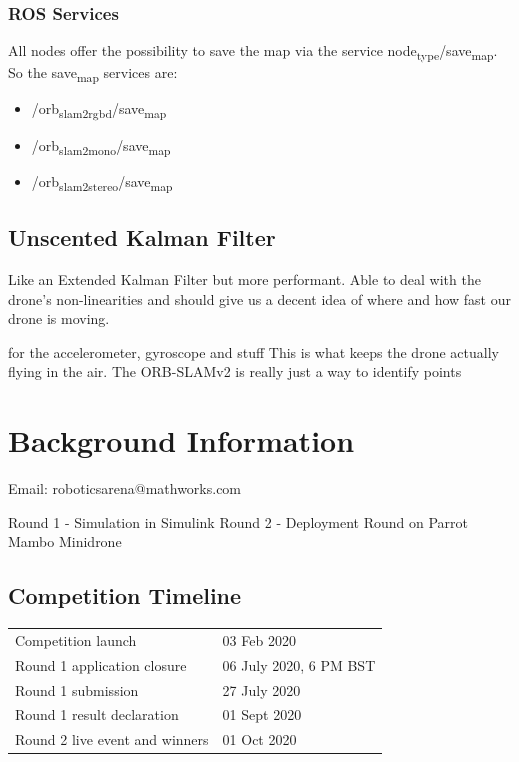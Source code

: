 \documentclass[unrestricted]{meetingnotesminutes}
\begin{document}
\subsubsection{ROS Services}
\label{sec:org0210efe}

All nodes offer the possibility to save the map via the service node\textsubscript{type}/save\textsubscript{map}. So the save\textsubscript{map} services are:

\begin{itemize}
\item /orb\textsubscript{slam2}\textsubscript{rgbd}/save\textsubscript{map}
\item /orb\textsubscript{slam2}\textsubscript{mono}/save\textsubscript{map}
\item /orb\textsubscript{slam2}\textsubscript{stereo}/save\textsubscript{map}
\end{itemize}

\subsection{Unscented Kalman Filter}
\label{sec:org2ff467a}

Like an Extended Kalman Filter but more performant.
Able to deal with the drone's non-linearities and should give us a decent idea of where and how fast our drone is moving.

for the accelerometer, gyroscope and stuff
This is what keeps the drone actually flying in the air.
The ORB-SLAMv2 is really just a way to identify points

\section{Background Information}
\label{sec:org314e623}
Email: roboticsarena@mathworks.com

Round 1 - Simulation in Simulink
Round 2 - Deployment Round on Parrot Mambo Minidrone

\subsection{Competition Timeline}
\label{sec:orga9fca6d}

\begin{center}
\begin{tabular}{ll}
Competition launch & 03 Feb 2020\\
Round 1 application closure & 06 July 2020, 6 PM BST\\
Round 1 submission & 27 July 2020\\
Round 1 result declaration & 01 Sept 2020\\
Round 2 live event and winners & 01 Oct 2020\\
\end{tabular}
\end{center}
\end{document}
